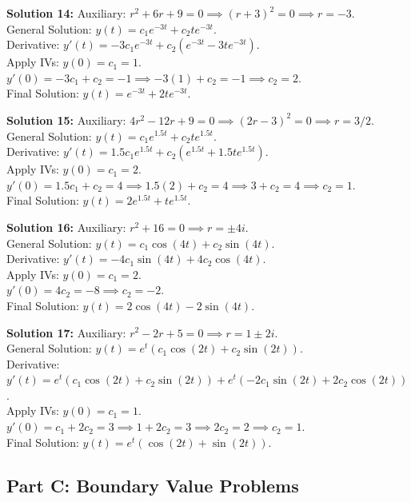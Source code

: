 \documentclass[11pt]{article}
\begin{document}
\textbf{Solution 14:} 
Auxiliary: $r^2 + 6r + 9 = 0 \implies (r + 3)^2 = 0 \implies r = -3$. \\
General Solution: $y(t) = c_1e^{-3t} + c_2te^{-3t}$. \\
Derivative: $y'(t) = -3c_1e^{-3t} + c_2(e^{-3t} - 3te^{-3t})$. \\
Apply IVs: $y(0) = c_1 = 1$. \\
$y'(0) = -3c_1 + c_2 = -1 \implies -3(1) + c_2 = -1 \implies c_2 = 2$. \\
Final Solution: $y(t) = e^{-3t} + 2te^{-3t}$.

\textbf{Solution 15:} 
Auxiliary: $4r^2 - 12r + 9 = 0 \implies (2r - 3)^2 = 0 \implies r = 3/2$. \\
General Solution: $y(t) = c_1e^{1.5t} + c_2te^{1.5t}$. \\
Derivative: $y'(t) = 1.5c_1e^{1.5t} + c_2(e^{1.5t} + 1.5te^{1.5t})$. \\
Apply IVs: $y(0) = c_1 = 2$. \\
$y'(0) = 1.5c_1 + c_2 = 4 \implies 1.5(2) + c_2 = 4 \implies 3 + c_2 = 4 \implies c_2 = 1$. \\
Final Solution: $y(t) = 2e^{1.5t} + te^{1.5t}$.

\textbf{Solution 16:} 
Auxiliary: $r^2 + 16 = 0 \implies r = \pm 4i$. \\
General Solution: $y(t) = c_1\cos(4t) + c_2\sin(4t)$. \\
Derivative: $y'(t) = -4c_1\sin(4t) + 4c_2\cos(4t)$. \\
Apply IVs: $y(0) = c_1 = 2$. \\
$y'(0) = 4c_2 = -8 \implies c_2 = -2$. \\
Final Solution: $y(t) = 2\cos(4t) - 2\sin(4t)$.

\textbf{Solution 17:} 
Auxiliary: $r^2 - 2r + 5 = 0 \implies r = 1 \pm 2i$. \\
General Solution: $y(t) = e^t(c_1\cos(2t) + c_2\sin(2t))$. \\
Derivative: $y'(t) = e^t(c_1\cos(2t) + c_2\sin(2t)) + e^t(-2c_1\sin(2t) + 2c_2\cos(2t))$. \\
Apply IVs: $y(0) = c_1 = 1$. \\
$y'(0) = c_1 + 2c_2 = 3 \implies 1 + 2c_2 = 3 \implies 2c_2 = 2 \implies c_2 = 1$. \\
Final Solution: $y(t) = e^t(\cos(2t) + \sin(2t))$.

\subsection*{Part C: Boundary Value Problems}
\end{document}
